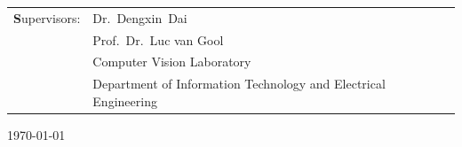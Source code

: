 \begin{titlepage}
\begin{center}
\end{center}


\vfill
\begin{center}
\begin{tabular}{ll}
\Large{\textbf Supervisors:} &  \Large{Dr.~Dengxin~Dai}\\ 
                             &  \Large{Prof.~Dr.~Luc van Gool}\\
 			    & \small{Computer Vision Laboratory}\\
			    & \small{Department of Information Technology and Electrical Engineering}\\
\end{tabular}
\end{center}

\begin{center}
\today\\
\end{center}


\end{titlepage}
